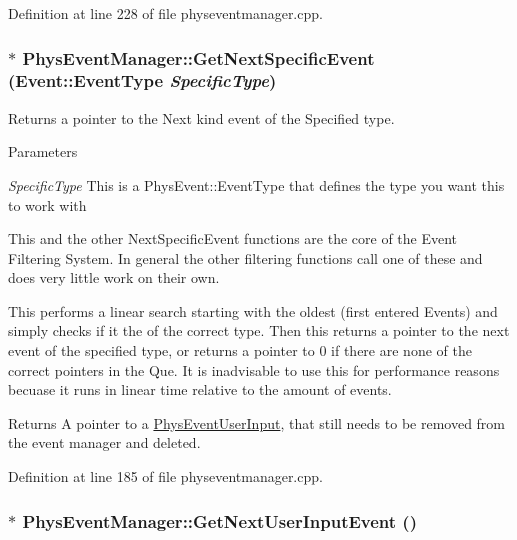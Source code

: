 Definition at line 228 of file physeventmanager.cpp.

\hypertarget{classPhysEventManager_abf1dd378082dde44e9bcebc900f7edf6}{
\subsubsection[{GetNextSpecificEvent}]{ $\ast$ PhysEventManager::GetNextSpecificEvent ({\bf Event::EventType} {\em SpecificType})}}
\label{d5/dd7/classPhysEventManager_abf1dd378082dde44e9bcebc900f7edf6}


Returns a pointer to the Next kind event of the Specified type. 


\begin{DoxyParams}{Parameters}
\item[{\em SpecificType}]This is a PhysEvent::EventType that defines the type you want this to work with\end{DoxyParams}
This and the other NextSpecificEvent functions are the core of the Event Filtering System. In general the other filtering functions call one of these and does very little work on their own. \par
 This performs a linear search starting with the oldest (first entered Events) and simply checks if it the of the correct type. Then this returns a pointer to the next event of the specified type, or returns a pointer to 0 if there are none of the correct pointers in the Que. It is inadvisable to use this for performance reasons becuase it runs in linear time relative to the amount of events. \begin{DoxyReturn}{Returns}
A pointer to a \hyperlink{classPhysEventUserInput}{PhysEventUserInput}, that still needs to be removed from the event manager and deleted. 
\end{DoxyReturn}


Definition at line 185 of file physeventmanager.cpp.

\hypertarget{classPhysEventManager_a4874a9b1138d2351bf28e527a66c02b8}{
\subsubsection[{GetNextUserInputEvent}]{ $\ast$ PhysEventManager::GetNextUserInputEvent ()}}
\label{d5/dd7/classPhysEventManager_a4874a9b1138d2351bf28e527a66c02b8}



